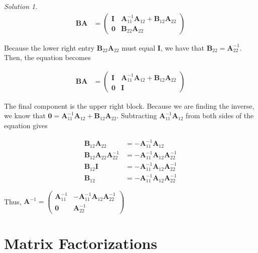 \documentclass[
]{book}
\theoremstyle{definition}
\theoremstyle{definition}
\theoremstyle{definition}
\theoremstyle{remark}
\newtheorem*{solution}{Solution}
\begin{document}
\begin{solution}
\[
\begin{aligned}
\mathbf{B}\mathbf{A} & = \begin{pmatrix} \mathbf{I} & \mathbf{A}_{11}^{-1} \mathbf{A}_{12} + \mathbf{B}_{12} \mathbf{A}_{22} \\ \mathbf{0} & \mathbf{B}_{22} \mathbf{A}_{22}\end{pmatrix}
\end{aligned}
\]

Because the lower right entry \(\mathbf{B}_{22} \mathbf{A}_{22}\) must equal \(\mathbf{I}\), we have that \(\mathbf{B}_{22} = \mathbf{A}_{22}^{-1}\). Then, the equation becomes

\[
\begin{aligned}
\mathbf{B}\mathbf{A} & = \begin{pmatrix} \mathbf{I} & \mathbf{A}_{11}^{-1} \mathbf{A}_{12} + \mathbf{B}_{12} \mathbf{A}_{22} \\ \mathbf{0} & \mathbf{I} \end{pmatrix}
\end{aligned}
\]

The final component is the upper right block. Because we are finding the inverse, we know that \(\mathbf{0} = \mathbf{A}_{11}^{-1} \mathbf{A}_{12} + \mathbf{B}_{12} \mathbf{A}_{22}\). Subtracting \(\mathbf{A}_{11}^{-1} \mathbf{A}_{12}\) from both sides of the equation gives

\[
\begin{aligned}
\mathbf{B}_{12} \mathbf{A}_{22} & = - \mathbf{A}_{11}^{-1} \mathbf{A}_{12} \\
\mathbf{B}_{12} \mathbf{A}_{22} \mathbf{A}_{22}^{-1} & = - \mathbf{A}_{11}^{-1} \mathbf{A}_{12} \mathbf{A}_{22}^{-1}\\
\mathbf{B}_{12} \mathbf{I} & = - \mathbf{A}_{11}^{-1} \mathbf{A}_{12} \mathbf{A}_{22}^{-1}\\
\mathbf{B}_{12} & = - \mathbf{A}_{11}^{-1} \mathbf{A}_{12} \mathbf{A}_{22}^{-1}
\end{aligned}
\]

Thus, \(\mathbf{A}^{-1} = \begin{pmatrix} \mathbf{A}_{11}^{-1} & - \mathbf{A}_{11}^{-1} \mathbf{A}_{12} \mathbf{A}_{22}^{-1} \\ \mathbf{0} & \mathbf{A}_{22}^{-1} \end{pmatrix}\)

\end{solution}

\hypertarget{matrix-factorizations}{%
\chapter{Matrix Factorizations}\label{matrix-factorizations}}
\end{document}
